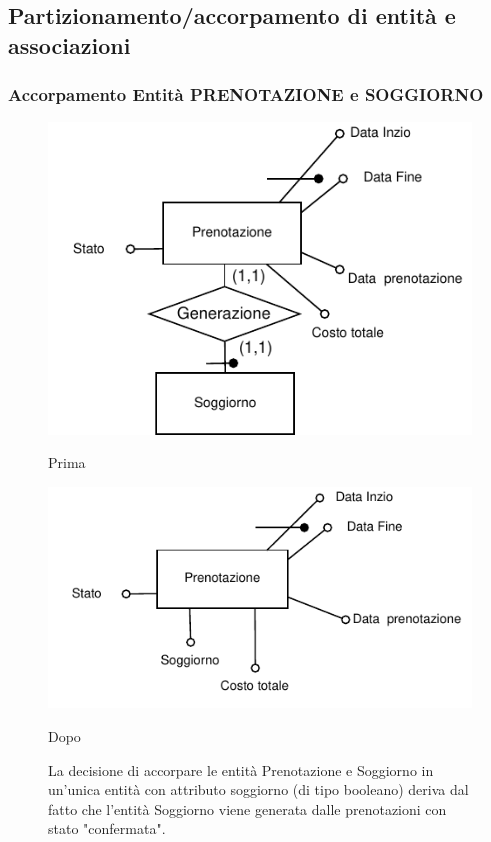 \subsection{Partizionamento/accorpamento di entità e associazioni}
\subsubsection{Accorpamento Entità PRENOTAZIONE e SOGGIORNO}
\begin{figure}[H]
      \centering
      \begin{minipage}[b]{0.45\textwidth}
            \includegraphics[width=\textwidth]{resources/pdf/page13.pdf}
            \caption{Prima}
      \end{minipage}
      \hfill
      \begin{minipage}[b]{0.45\textwidth}
            \includegraphics[width=\textwidth]{resources/pdf/page14.pdf}
            \caption{Dopo}
      \end{minipage}
      \caption*{La decisione di accorpare le entità Prenotazione e Soggiorno in un'unica entità con attributo soggiorno (di tipo booleano) deriva dal fatto che l'entità Soggiorno viene generata dalle prenotazioni con stato "confermata".}
\end{figure}

